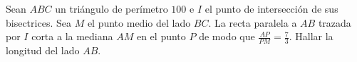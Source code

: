 Sean $ABC$ un triángulo de perímetro $100$ e $I$ el punto de intersección de sus bisectrices.
Sea $M$ el punto medio del lado $BC$.
La recta paralela a $AB$ trazada por $I$ corta a la mediana $AM$ en el punto $P$ de modo que $\frac{AP}{PM} = \frac{7}{3}$.
Hallar la longitud del lado $AB$.
